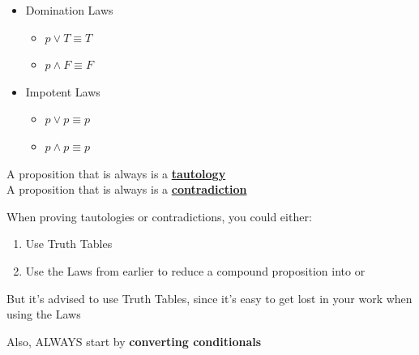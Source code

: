\documentclass[../../Main.tex]{subfiles}
\begin{document}
\begin{itemize}
    \item
    {
        Domination Laws

        \begin{itemize}
            \item $p \lor T \equiv T$
            \item $p \land F \equiv F$
        \end{itemize}
    }

    \item
    {
        Impotent Laws

        \begin{itemize}
            \item $p \lor p \equiv p$
            \item $p \land p \equiv p$
        \end{itemize}
    }

\end{itemize}

\begin{definition}
    A proposition that is always \TRUE is a \underline{\textbf{tautology}}
    \\
    A proposition that is always \FALSE is a \underline{\textbf{contradiction}}
\end{definition}

\begin{note}
    When proving tautologies or contradictions, you could either:

    \begin{center}
        \begin{enumerate}
            \item Use Truth Tables
            \item Use the Laws from earlier to reduce a compound proposition into \TRUE or \FALSE
        \end{enumerate}
    \end{center}

    But it's advised to use Truth Tables, since it's easy to get lost in your work when using the Laws

    Also, ALWAYS start by \textbf{converting conditionals}
\end{note}
\end{document}
